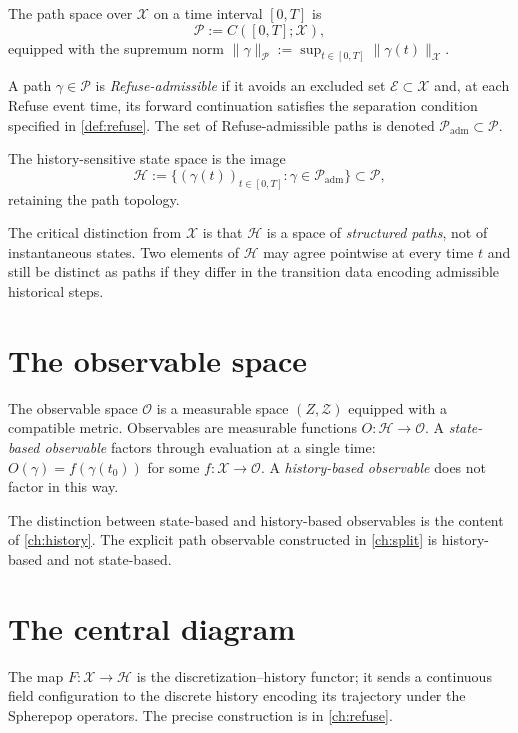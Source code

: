 \documentclass[12pt, oneside]{memoir}
\newcommand{\X}{\mathcal{X}}
\newcommand{\Hcal}{\mathcal{H}}
\newcommand{\OO}{\mathcal{O}}
\newcommand{\PP}{\mathcal{P}}
\newcommand{\Padm}{\mathcal{P}_{\mathrm{adm}}}
\newcommand{\nnorm}[1]{\lVert #1 \rVert}
\begin{document}
\begin{definition}
\label{def:H}
The path space over $\X$ on a time interval $[0,T]$ is
\[
  \PP := C([0,T];\X),
\]
equipped with the supremum norm $\nnorm{\gamma}_\PP := \sup_{t \in [0,T]} \nnorm{\gamma(t)}_\X$.

A path $\gamma \in \PP$ is \emph{Refuse-admissible} if it avoids an excluded set
$\mathcal{E} \subset \X$ and, at each Refuse event time, its forward continuation
satisfies the separation condition specified in \cref{def:refuse}.  The set of
Refuse-admissible paths is denoted $\Padm \subset \PP$.

The history-sensitive state space is the image
\[
  \Hcal := \{ (\gamma(t))_{t \in [0,T]} : \gamma \in \Padm \} \subset \PP,
\]
retaining the path topology.
\end{definition}

The critical distinction from $\X$ is that $\Hcal$ is a space of \emph{structured paths},
not of instantaneous states.  Two elements of $\Hcal$ may agree pointwise at every time
$t$ and still be distinct as paths if they differ in the transition data encoding
admissible historical steps.

\section{The observable space}

\begin{definition}
\label{def:O}
The observable space $\OO$ is a measurable space $(Z, \mathcal{Z})$ equipped with a
compatible metric.  Observables are measurable functions $O: \Hcal \to \OO$.  A
\emph{state-based observable} factors through evaluation at a single time:
$O(\gamma) = f(\gamma(t_0))$ for some $f: \X \to \OO$.  A
\emph{history-based observable} does not factor in this way.
\end{definition}

The distinction between state-based and history-based observables is the content of
\cref{ch:history}.  The explicit path observable constructed in \cref{ch:split} is
history-based and not state-based.

\section{The central diagram}

The map $F: \X \to \Hcal$ is the discretization--history functor; it sends a
continuous field configuration to the discrete history encoding its trajectory under the
Spherepop operators.  The precise construction is in \cref{ch:refuse}.
\end{document}

